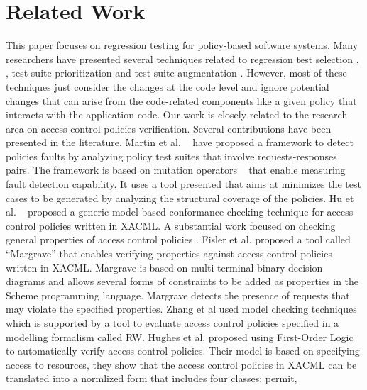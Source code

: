 \section{Related Work}
\label{sec:related}
This paper focuses on regression testing for policy-based software systems. 
Many researchers have presented several techniques related to regression test selection \cite{Rothermel:1996:ART:235681.235682}, 
\cite{Graves:2001:ESR:367008.367020}, test-suite prioritization \cite{Elbaum:2000:PTC:347324.348910} and test-suite augmentation \cite{santelices08sep}. 
However, most of these techniques just consider the changes at the code level and ignore potential changes that can arise from the code-related components like a given policy that interacts with the application code. 
Our work is closely related to the research area on access control policies verification. Several contributions have been 
presented in the literature. Martin et al. ~\cite{martin06:defining} have proposed a framework to detect policies faults by analyzing
 policy test suites that involve 
requests-responses pairs. The framework is based on mutation operators ~\cite{martin07:fault} that enable measuring fault detection capability. 
It uses a tool \cite {martin07:automated} presented that aims at minimizes the test cases to be generated by analyzing the structural coverage of the policies.
Hu et al. ~\cite{hu07:conformance} proposed a generic model-based conformance checking technique for access control policies written in
XACML.
A substantial work focused on checking general properties of access control policies 
\cite{Fisler:2005:VCA:1062455.1062502,Lupu99conflictsin,Jajodia:1997:LLE:882493.884380,Bonatti:2000:MAC:352600.352623}. 
Fisler et al. \cite{Fisler:2005:VCA:1062455.1062502} proposed a tool called ``Margrave'' that enables verifying properties against 
access control policies written in XACML. Margrave is based on multi-terminal binary decision diagrams and allows several forms of 
constraints to be added as properties in the Scheme programming language. Margrave detects the presence of requests that may violate the specified properties.
Zhang et al \cite{DBLP:conf/isw/ZhangRG05} used model checking techniques which is supported by a tool to evaluate access
control policies specified in a modelling formalism called RW. Hughes et al. \cite{hughes04:automated} proposed using First-Order Logic 
to automatically verify access control policies. Their model is based on specifying access to resources, they show that the access
control policies in XACML can be translated into a normlized form that includes four classes: permit,

